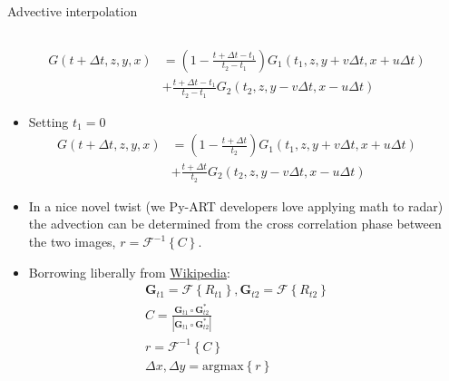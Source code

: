 \documentclass[final]{beamer}
\begin{document}
\begin{frame}{}
\begin{columns}[t]
\begin{column}{.3\linewidth}
\begin{block}{Advective interpolation}
\begin{columns}[t]
\begin{column}{.6\linewidth}
\begin{itemize}
		\small
		\begin{align*}
                G(t + \Delta{}t, z, y, x) &= (1 - \frac{t + \Delta{}t - t_1}{t_2 - t_1})G_1(t_1, z, y + v\Delta{}t, x + u\Delta{}t) \\
                                             &+ \frac{t + \Delta{}t - t_1}{t_2 - t_1}G_2(t_2, z, y - v\Delta{}t, x - u\Delta{}t)
                \end{align*}
                \normalsize
               \item Setting $t_1 = 0$
               \small
                \begin{align*}
                G(t + \Delta{}t, z, y, x) &= (1 - \frac{t + \Delta{}t}{t_2 })G_1(t_1, z, y + v\Delta{}t, x + u\Delta{}t) \\
                                             &+ \frac{t + \Delta{}t}{t_2}G_2(t_2, z, y - v\Delta{}t, x - u\Delta{}t)
                \end{align*}
                \normalsize
                \item In a nice novel twist (we Py-ART developers love applying math to radar) the advection can be determined from the cross correlation phase between the two images, 
                $r = \mathcal{F}^{-1}\left\{C\right\}$.
                \item Borrowing liberally from \hyperlink{http://en.wikipedia.org/wiki/Phase_correlation}{Wikipedia}: 
                	\small
		\begin{gather*}
		\boldsymbol{G}_{t1} = \mathcal{F}\left\{R_{t1}\right\}, \boldsymbol{G}_{t2} = \mathcal{F}\left\{R_{t2}\right\}\\
		C = \frac{\boldsymbol{G}_{t1}\circ\boldsymbol{G}^*_{t2}}{\left|\boldsymbol{G}_{t1}\circ\boldsymbol{G}^*_{t2}\right|}\\
		r = \mathcal{F}^{-1}\left\{C\right\}\\
		\Delta{}x, \Delta{}y = \mathrm{argmax}\left\{r\right\}
				\end{gather*}
		\normalsize

            
                \end{itemize}
		\end{column}
                \begin{column}{.4\linewidth}
            

\end{column}
\end{columns}
\end{block}
\end{column}
\end{columns}
\end{frame}
\end{document}
